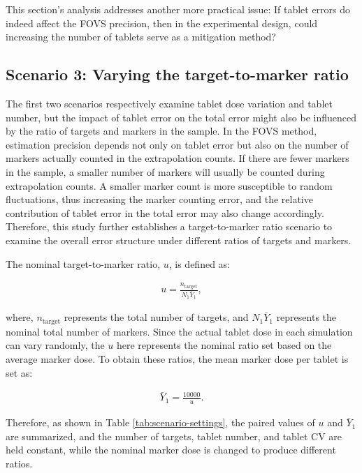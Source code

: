 \documentclass[
  12pt,
]{article}
\begin{document}
This section's analysis addresses another more practical issue: If
tablet errors do indeed affect the FOVS precision, then in the
experimental design, could increasing the number of tablets serve as a
mitigation method?

\subsection{Scenario 3: Varying the target-to-marker
ratio}\label{scenario-3-varying-the-target-to-marker-ratio}

The first two scenarios respectively examine tablet dose variation and
tablet number, but the impact of tablet error on the total error might
also be influenced by the ratio of targets and markers in the sample. In
the FOVS method, estimation precision depends not only on tablet error
but also on the number of markers actually counted in the extrapolation
counts. If there are fewer markers in the sample, a smaller number of
markers will usually be counted during extrapolation counts. A smaller
marker count is more susceptible to random fluctuations, thus increasing
the marker counting error, and the relative contribution of tablet error
in the total error may also change accordingly. Therefore, this study
further establishes a target-to-marker ratio scenario to examine the
overall error structure under different ratios of targets and markers.

The nominal target-to-marker ratio, \(u\), is defined as:

\begin{align}
\label{eqn:u} u = \frac{n_{\mathrm{target}}}{N_1 \bar{Y}_1},
\end{align}

where, \(n_{\mathrm{target}}\) represents the total number of targets,
and \(N_1\bar{Y}_1\) represents the nominal total number of markers.
Since the actual tablet dose in each simulation can vary randomly, the
\(u\) here represents the nominal ratio set based on the average marker
dose. To obtain these ratios, the mean marker dose per tablet is set as:

\begin{align}
\label{eqn:Ybar1u} \bar{Y}_1 = \frac{10000}{u}.
\end{align}

Therefore, as shown in Table \ref{tab:scenario-settings}, the paired
values of \(u\) and \(\bar{Y}_1\) are summarized, and the number of
targets, tablet number, and tablet CV are held constant, while the
nominal marker dose is changed to produce different ratios.
\end{document}
